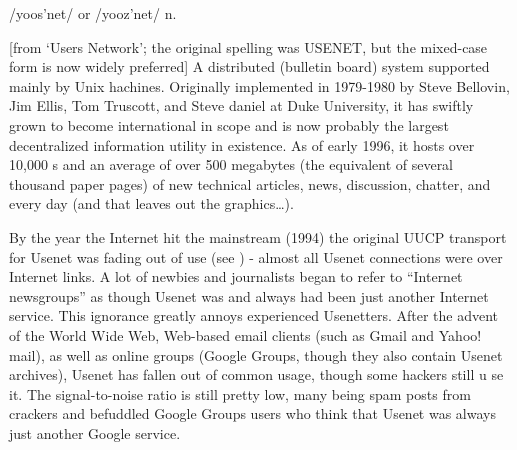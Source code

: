  /yoos'net/ or /yooz'net/ n.

[from `Users Network'; the original spelling was USENET, but the mixed-case form is now widely preferred] A distributed 
(bulletin board) system supported mainly by Unix hachines. Originally implemented in 1979-1980 by Steve Bellovin, Jim Ellis, Tom Truscott,
and Steve daniel at Duke University, it has swiftly grown to become international in scope and is now probably the largest decentralized
information utility in existence. As of early 1996, it hosts over 10,000 s and an average of over 500 megabytes (the
equivalent of several thousand paper pages) of new technical articles, news, discussion, chatter, and  every day (and
that leaves out the graphics\dots).

By the year the Internet hit the mainstream (1994) the original UUCP transport for Usenet was fading out of use (see )
- almost all Usenet connections were over Internet links. A lot of newbies and journalists began to refer to ``Internet newsgroups'' as
though Usenet was and always had been just another Internet service. This ignorance greatly annoys experienced Usenetters. After the
advent of the World Wide Web, Web-based email clients (such as Gmail and Yahoo! mail), as well as online groups (Google Groups, though
they also contain Usenet archives), Usenet has fallen out of common usage, though some hackers still u se it. The signal-to-noise ratio
is still pretty low, many being spam posts from crackers and befuddled Google Groups users who think that Usenet was always just another
Google service.

